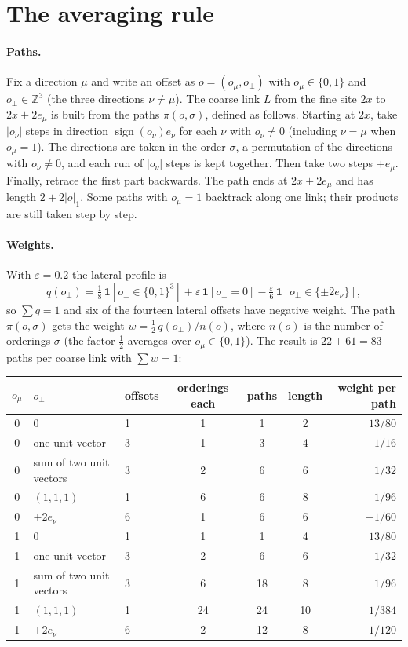 \documentclass[11pt,a4paper]{article}
\theoremstyle{definition}
\theoremstyle{remark}
\begin{document}
\appendix
\section{The averaging rule}\label{app:rule}

\paragraph{Paths.} Fix a direction $\mu$ and write an offset as $o=(o_\mu,o_\perp)$ with $o_\mu\in\{0,1\}$ and $o_\perp\in\mathbb Z^3$ (the three directions $\nu\ne\mu$). The coarse link $L$ from the fine site $2x$ to $2x+2e_\mu$ is built from the paths $\pi(o,\sigma)$, defined as follows. Starting at $2x$, take $|o_\nu|$ steps in direction $\operatorname{sign}(o_\nu)e_\nu$ for each $\nu$ with $o_\nu\ne0$ (including $\nu=\mu$ when $o_\mu=1$). The directions are taken in the order $\sigma$, a permutation of the directions with $o_\nu\ne0$, and each run of $|o_\nu|$ steps is kept together. Then take two steps $+e_\mu$. Finally, retrace the first part backwards. The path ends at $2x+2e_\mu$ and has length $2+2|o|_1$. Some paths with $o_\mu=1$ backtrack along one link; their products are still taken step by step.

\paragraph{Weights.} With $\varepsilon=0.2$ the lateral profile is
\[
q(o_\perp)=\tfrac18\,\mathbf 1[o_\perp\in\{0,1\}^3]+\varepsilon\,\mathbf 1[o_\perp=0]-\tfrac{\varepsilon}{6}\,\mathbf 1[o_\perp\in\{\pm2e_\nu\}],
\]
so $\sum q=1$ and six of the fourteen lateral offsets have negative weight. The path $\pi(o,\sigma)$ gets the weight $w=\frac12\,q(o_\perp)/n(o)$, where $n(o)$ is the number of orderings $\sigma$ (the factor $\frac12$ averages over $o_\mu\in\{0,1\}$). The result is $22+61=83$ paths per coarse link with $\sum w=1$:

\begin{center}\small
\begin{tabular}{@{}cllcccr@{}}\toprule
$o_\mu$ & $o_\perp$ & offsets & orderings each & paths & length & weight per path\\\midrule
0 & $0$ & 1 & 1 & 1 & 2 & $13/80$\\
0 & one unit vector & 3 & 1 & 3 & 4 & $1/16$\\
0 & sum of two unit vectors & 3 & 2 & 6 & 6 & $1/32$\\
0 & $(1,1,1)$ & 1 & 6 & 6 & 8 & $1/96$\\
0 & $\pm2e_\nu$ & 6 & 1 & 6 & 6 & $-1/60$\\\midrule
1 & $0$ & 1 & 1 & 1 & 4 & $13/80$\\
1 & one unit vector & 3 & 2 & 6 & 6 & $1/32$\\
1 & sum of two unit vectors & 3 & 6 & 18 & 8 & $1/96$\\
1 & $(1,1,1)$ & 1 & 24 & 24 & 10 & $1/384$\\
1 & $\pm2e_\nu$ & 6 & 2 & 12 & 8 & $-1/120$\\\bottomrule
\end{tabular}
\end{center}
\end{document}
